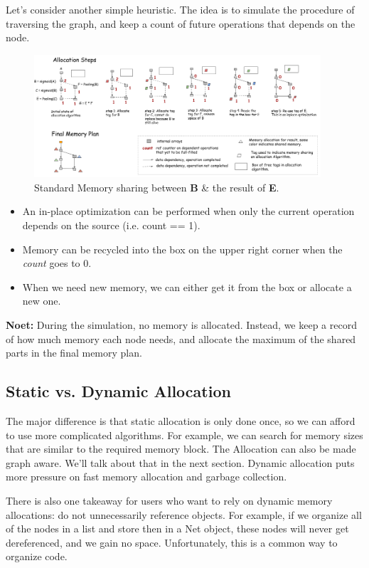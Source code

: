 Let’s consider another simple heuristic. The idea is to simulate the procedure of traversing the graph, and keep a count of future operations that depends on the node.
\begin{figure}[!hbtp]
\centering
\includegraphics[width=0.95\textwidth]{MXNet/alloc_step}
\caption{Standard Memory sharing between \textbf{B} \& the result of \textbf{E}.}
\end{figure}
\begin{itemize}
\item An in-place optimization can be performed when only the current operation depends on the source (i.e. count == 1).
\item Memory can be recycled into the box on the upper right corner when the \textit{count} goes to 0.
\item When we need new memory, we can either get it from the box or allocate a new one. 
\end{itemize}

\textbf{Noet:} During the simulation, no memory is allocated. Instead, we keep a record of how much memory each node needs, and allocate the maximum of the shared parts in the final memory plan.

\subsection{Static vs. Dynamic Allocation}
The major difference is that static allocation is only done once, so we can afford to use more complicated algorithms. For example, we can search for memory sizes that are similar to the required memory block. The Allocation can also be made graph aware. We’ll talk about that in the next section. Dynamic allocation puts more pressure on fast memory allocation and garbage collection.

There is also one takeaway for users who want to rely on dynamic memory allocations: do not unnecessarily reference objects. For example, if we organize all of the nodes in a list and store then in a Net object, these nodes will never get dereferenced, and we gain no space. Unfortunately, this is a common way to organize code.

